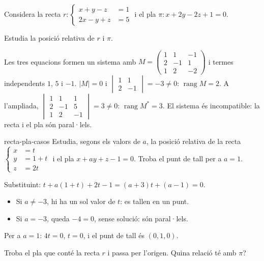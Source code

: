 Considera la recta $r\colon\left\{\begin{aligned}x+y-z&=1\\2x-y+z&=5\end{aligned}\right.$ i el pla
$\pi\colon x+2y-2z+1=0$.

\begin{apartats}

Estudia la posició relativa de $r$ i $\pi$.

\begin{solucio}
Les tres equacions formen un sistema amb
$M=\begin{pmatrix}1&1&-1\\2&-1&1\\1&2&-2\end{pmatrix}$ i termes independents $1$, $5$ i $-1$.
$|M|=0$ i $\begin{vmatrix}1&1\\2&-1\end{vmatrix}=-3\ne0$: $\operatorname{rang}M=2$. A l'ampliada,
$\begin{vmatrix}1&1&1\\2&-1&5\\1&2&-1\end{vmatrix}=3\ne0$: $\operatorname{rang}M^*=3$. El sistema és
incompatible: la recta i el pla són paral·lels.
\end{solucio}

\begin{tria}{recta-pla-casos}
Estudia, segons els valors de $a$, la posició relativa de la recta
$\left\{\begin{aligned}x&=t\\y&=1+t\\z&=2t\end{aligned}\right.$ i el pla $x+ay+z-1=0$. Troba el punt de
tall per a $a=1$.

\begin{solucio}
Substituint: $t+a(1+t)+2t-1=(a+3)t+(a-1)=0$.
\begin{itemize}
\item Si $a\ne-3$, hi ha un sol valor de $t$: es tallen en un punt.
\item Si $a=-3$, queda $-4=0$, sense solució: són paral·lels.
\end{itemize}
Per a $a=1$: $4t=0$, $t=0$, i el punt de tall és $(0,1,0)$.
\end{solucio}

Troba el pla que conté la recta $r$ i passa per l'origen. Quina relació té amb $\pi$?


\end{tria}
\end{apartats}
